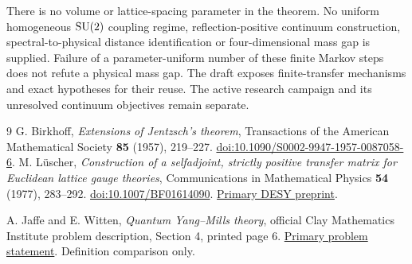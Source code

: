 \documentclass[11pt]{article}
\begin{document}
There is no volume or lattice-spacing parameter in the theorem.
No uniform homogeneous $\mathrm{SU}(2)$ coupling regime, reflection-positive continuum
construction, spectral-to-physical distance identification or
four-dimensional mass gap is supplied. Failure of a parameter-uniform
number of these finite Markov steps does not refute a physical mass gap.
The draft exposes finite-transfer mechanisms and exact hypotheses for
their reuse. The active research campaign and its unresolved continuum
objectives remain separate.

\begin{thebibliography}{9}
 G. Birkhoff,
\emph{Extensions of Jentzsch's theorem}, Transactions of the American
Mathematical Society \textbf{85} (1957), 219--227.
\href{https://doi.org/10.1090/S0002-9947-1957-0087058-6}
{doi:10.1090/S0002-9947-1957-0087058-6}.
 M. L\"uscher,
\emph{Construction of a selfadjoint, strictly positive transfer matrix
for Euclidean lattice gauge theories}, Communications in Mathematical
Physics \textbf{54} (1977), 283--292.
\href{https://doi.org/10.1007/BF01614090}{doi:10.1007/BF01614090}.
\href{https://bib-pubdb1.desy.de/record/396349/files/7611148.pdf}
{Primary DESY preprint}.

 A. Jaffe and E. Witten,
\emph{Quantum Yang--Mills theory}, official Clay Mathematics Institute
problem description, Section 4, printed page 6.
\href{https://www.claymath.org/wp-content/uploads/2022/06/yangmills.pdf}{Primary problem statement}.
Definition comparison only.
\end{thebibliography}
\end{document}
